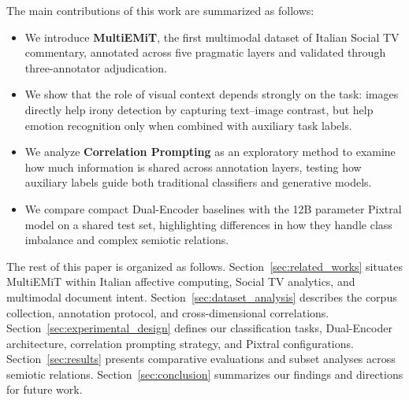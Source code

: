 The main contributions of this work are summarized as follows:
\begin{itemize}
    \item We introduce \textbf{MultiEMiT}, the first multimodal dataset of Italian Social TV commentary, annotated across five pragmatic layers and validated through three-annotator adjudication.
    \item We show that the role of visual context depends strongly on the task: images directly help irony detection by capturing text--image contrast, but help emotion recognition only when combined with auxiliary task labels.
    \item We analyze \textbf{Correlation Prompting} as an exploratory method to examine how much information is shared across annotation layers, testing how auxiliary labels guide both traditional classifiers and generative models.
    \item We compare compact Dual-Encoder baselines with the 12B parameter Pixtral model on a shared test set, highlighting differences in how they handle class imbalance and complex semiotic relations.
\end{itemize}

The rest of this paper is organized as follows. Section~\ref{sec:related_works} situates MultiEMiT within Italian affective computing, Social TV analytics, and multimodal document intent. Section~\ref{sec:dataset_analysis} describes the corpus collection, annotation protocol, and cross-dimensional correlations. Section~\ref{sec:experimental_design} defines our classification tasks, Dual-Encoder architecture, correlation prompting strategy, and Pixtral configurations. Section~\ref{sec:results} presents comparative evaluations and subset analyses across semiotic relations. Section~\ref{sec:conclusion} summarizes our findings and directions for future work.